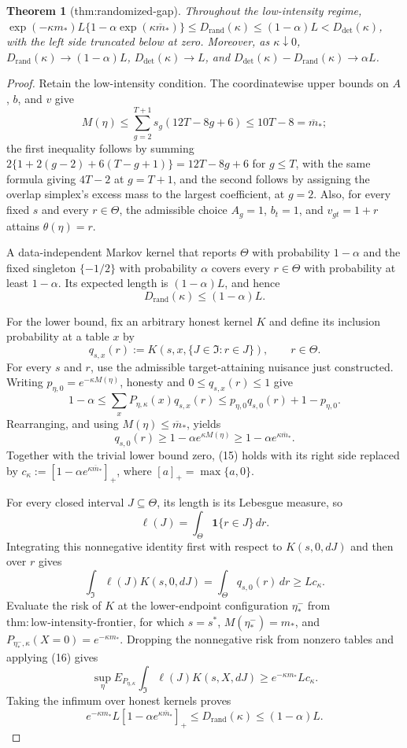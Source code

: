 \documentclass{article}
\newtheorem{theorem}{Theorem}
\begin{document}
\begin{theorem}[thm:randomized-gap]\label{thm:randomized-gap}
Throughout the low-intensity regime, \(\exp(-\kappa m_*)L\{1-\alpha\exp(\kappa\overline m_*)\}\le D_{\mathrm{rand}}(\kappa)\le(1-\alpha)L<D_{\mathrm{det}}(\kappa)\), with the left side truncated below at zero. Moreover, as \(\kappa\downarrow0\), \(D_{\mathrm{rand}}(\kappa)\to(1-\alpha)L\), \(D_{\mathrm{det}}(\kappa)\to L\), and \(D_{\mathrm{det}}(\kappa)-D_{\mathrm{rand}}(\kappa)\to\alpha L\).
\end{theorem}
\begin{proof}
Retain the low-intensity condition.  The coordinatewise upper bounds on \(A\), \(b\), and \(v\) give
\[
 M(\eta)\le\sum_{g=2}^{T+1}s_g(12T-8g+6)
 \le10T-8=\overline m_*;
\tag{13}
\]
the first inequality follows by summing \(2\{1+2(g-2)+6(T-g+1)\}=12T-8g+6\) for \(g\le T\), with the same formula giving \(4T-2\) at \(g=T+1\), and the second follows by assigning the overlap simplex's excess mass to the largest coefficient, at \(g=2\).  Also, for every fixed \(s\) and every \(r\in\Theta\), the admissible choice \(A_g=1\), \(b_t=1\), and \(v_{gt}=1+r\) attains \(\theta(\eta)=r\).

A data-independent Markov kernel that reports \(\Theta\) with probability \(1-\alpha\) and the fixed singleton \(\{-1/2\}\) with probability \(\alpha\) covers every \(r\in\Theta\) with probability at least \(1-\alpha\).  Its expected length is \((1-\alpha)L\), and hence
\[
 D_{\mathrm{rand}}(\kappa)\le(1-\alpha)L.
\tag{14}
\]

For the lower bound, fix an arbitrary honest kernel \(K\) and define its inclusion probability at a table \(x\) by
\[
 q_{s,x}(r):=K(s,x,\{J\in\mathfrak I:r\in J\}),
 \qquad r\in\Theta.
\]
For every \(s\) and \(r\), use the admissible target-attaining nuisance just constructed.  Writing \(p_{\eta,0}=e^{-\kappa M(\eta)}\), honesty and \(0\le q_{s,x}(r)\le1\) give
\[
 1-\alpha
 \le \sum_xP_{\eta,\kappa}(x)q_{s,x}(r)
 \le p_{\eta,0}q_{s,0}(r)+1-p_{\eta,0}.
\]
Rearranging, and using \(M(\eta)\le\overline m_*\), yields
\[
 q_{s,0}(r)\ge1-\alpha e^{\kappa M(\eta)}
 \ge1-\alpha e^{\kappa\overline m_*}.
\tag{15}
\]
Together with the trivial lower bound zero, (15) holds with its right side replaced by
\(c_\kappa:=[1-\alpha e^{\kappa\overline m_*}]_+\), where \([a]_+=\max\{a,0\}\).

For every closed interval \(J\subseteq\Theta\), its length is its Lebesgue measure, so
\[
 \ell(J)=\int_\Theta \mathbf 1\{r\in J\}\,dr.
\]
Integrating this nonnegative identity first with respect to \(K(s,0,dJ)\) and then over \(r\) gives
\[
 \int_{\mathfrak I}\ell(J)K(s,0,dJ)
 =\int_\Theta q_{s,0}(r)\,dr
 \ge Lc_\kappa.
\tag{16}
\]
Evaluate the risk of \(K\) at the lower-endpoint configuration \(\eta_*^-\) from \(\mathrm{thm{:}low\text{-}intensity\text{-}frontier}\), for which \(s=s^*\), \(M(\eta_*^-)=m_*\), and \(P_{\eta_*^-,\kappa}(X=0)=e^{-\kappa m_*}\).  Dropping the nonnegative risk from nonzero tables and applying (16) gives
\[
 \sup_\eta E_{P_{\eta,\kappa}}
       \int_{\mathfrak I}\ell(J)K(s,X,dJ)
 \ge e^{-\kappa m_*}Lc_\kappa.
\]
Taking the infimum over honest kernels proves
\[
 e^{-\kappa m_*}L[1-\alpha e^{\kappa\overline m_*}]_+
 \le D_{\mathrm{rand}}(\kappa)\le(1-\alpha)L.
\tag{17}
\]


\end{proof}
\end{document}
